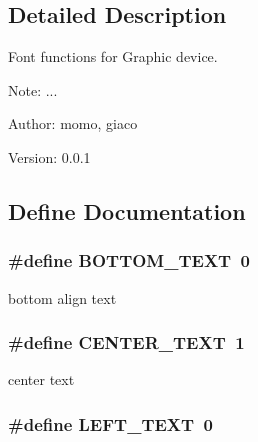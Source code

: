 \subsection{Detailed Description}
Font functions for Graphic device. 

\begin{Desc}
\item[Note:]... \end{Desc}
\begin{Desc}
\item[Author:]momo, giaco \end{Desc}
\begin{Desc}
\item[Version:]0.0.1 \end{Desc}


\subsection{Define Documentation}
\hypertarget{group__graphic__device__font_g02b7607c323731f6b5d4c4aba6eb8f70}{
\subsubsection[{BOTTOM\_\-TEXT}]{\setlength{\rightskip}{0pt plus 5cm}\#define BOTTOM\_\-TEXT~0}}
\label{group__graphic__device__font_g02b7607c323731f6b5d4c4aba6eb8f70}


bottom align text \hypertarget{group__graphic__device__font_gd0ae9e6dc7894a5b6b1e36fc5260b862}{
\subsubsection[{CENTER\_\-TEXT}]{\setlength{\rightskip}{0pt plus 5cm}\#define CENTER\_\-TEXT~1}}
\label{group__graphic__device__font_gd0ae9e6dc7894a5b6b1e36fc5260b862}


center text \hypertarget{group__graphic__device__font_geaf74eaabed8649b362d27e238658343}{
\subsubsection[{LEFT\_\-TEXT}]{\setlength{\rightskip}{0pt plus 5cm}\#define LEFT\_\-TEXT~0}}
\label{group__graphic__device__font_geaf74eaabed8649b362d27e238658343}


